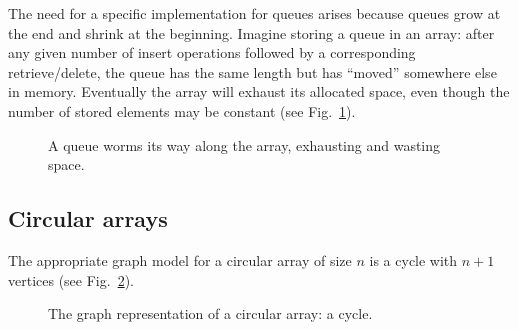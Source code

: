 \documentclass[a4paper]{book}
\theoremstyle{changebreak}                %
\begin{document}
The need for a specific implementation for queues arises because
queues grow at the end and shrink at the beginning. Imagine storing a
queue in an array: after any given number of insert operations
followed by a corresponding retrieve/delete, the queue has the same
length but has ``moved'' somewhere else in memory. Eventually the
array will exhaust its allocated space, even though the number of
stored elements may be constant (see Fig.~\ref{f:qgrow}).
\begin{figure}[!ht]
\begin{center}
\end{center}
\caption{A queue worms its way along the array, exhausting and wasting
  space.}
\label{f:qgrow}
\end{figure}

\subsection{Circular arrays}
\label{s:linear:circarray}
The appropriate graph model for a circular array of size $n$ is a
cycle with $n+1$ vertices (see Fig.~\ref{f:qcycle}).
\begin{figure}[!ht]
\begin{center}
\end{center}
\caption{The graph representation of a circular array: a cycle.}
\label{f:qcycle}
\end{figure}
\end{document}
